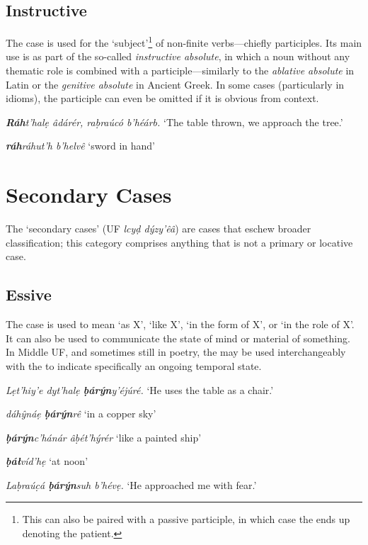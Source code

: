 \documentclass[a4paper, 12pt, twoside, openright, final]{book}
\def \b {ḅ}
\let \w \textit
\let \b \textbf
\begin{document}
\subsection{Instructive}
The  case is used for the ‘subject’\footnote{This can also be paired with a passive participle, in which case the
 ends up denoting the patient.} of non-finite verbs—chiefly participles. Its main use is as part of the so-called \textit{instructive
absolute}, in which a noun without any thematic role is combined with a participle—similarly to the \textit{ablative absolute} in
Latin or the \textit{genitive absolute} in Ancient Greek. In some cases (particularly in idioms), the participle can even be
omitted if it is obvious from context.
\begin{examples}
    \item \w{\b{Ráh}t’halẹ âdárér, raḅraúcó b’héárb.} ‘The table thrown, we approach the tree.’
    \item \w{\b{ráh}ráhut’h b’helvê} ‘sword in hand’
\end{examples}

\section{Secondary Cases}
The ‘secondary cases’ (UF \w{lcyḍ dýzy’êâ}) are cases that eschew broader classification; this category comprises anything
that is not a primary or locative case.

\subsection{Essive}
The  case is used to mean ‘as X’, ‘like X’, ‘in the form of X’, or ‘in the role of X’. It can also be used to
communicate the state of mind or material of something. In Middle UF, and sometimes still in poetry, the  may be
used interchangeably with the  to indicate specifically an ongoing temporal state.
\begin{examples}
    \item \w{Lẹt’hiy’e dyt’halẹ \b{ḅárýn}y’éjúré.} ‘He uses the table as a chair.’
    \item \w{dáhŷnáẹ \b{ḅárýn}rê} ‘in a copper sky’
    \item \w{\b{ḅárýn}c’hánár âḅét’hýrér} ‘like a painted ship’
    \item \w{\b{ḅáł}víd’hẹ} ‘at noon’
    \item \w{Laḅraúc̣á \b{ḅárýn}suh b’hévẹ.} ‘He approached me with fear.’
\end{examples}
\end{document}
